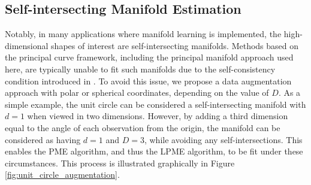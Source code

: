\documentclass[11pt,reqno]{article}
\theoremstyle{definition}
\begin{document}
\subsection{Self-intersecting Manifold Estimation}\label{ss:selfInt}

Notably, in many applications where manifold learning is implemented, the high-dimensional shapes of interest are self-intersecting manifolds. Methods based on the principal curve framework, including the principal manifold approach used here, are typically unable to fit such manifolds due to the self-consistency condition introduced in \cite{hastiePrincipalCurves1989}. To avoid this issue, we propose a data augmentation approach with polar or spherical coordinates, depending on the value of $D$. As a simple example, the unit circle can be considered a self-intersecting manifold with $d = 1$ when viewed in two dimensions. However, by adding a third dimension equal to the angle of each observation from the origin, the manifold can be considered as having $d = 1$ and $D = 3$, while avoiding any self-intersections. This enables the PME algorithm, and thus the LPME algorithm, to be fit under these circumstances. This process is illustrated graphically in Figure \ref{fig:unit_circle_augmentation}.
\end{document}

